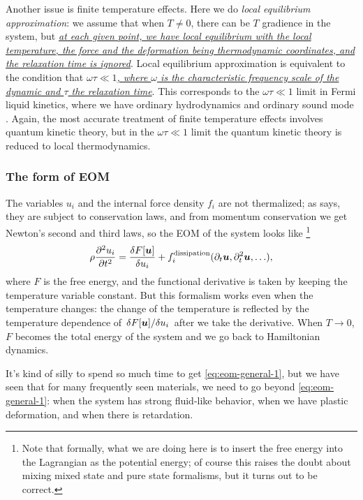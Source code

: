 \documentclass[hyperref, a4paper]{article}
\begin{document}
Another issue is finite temperature effects. 
Here we do \emph{local equilibrium approximation}:
we assume that when $T \neq 0$,
there can be $T$ gradience in the system,
but \ul{\emph{at each given point, 
we have local equilibrium with the local temperature, the force and the deformation
being thermodynamic coordinates,
and the relaxation time is ignored}}.
Local equilibrium approximation is equivalent to the 
condition that \ul{\emph{$\omega \tau \ll 1$,
where $\omega$ is the characteristic frequency scale of the dynamic
and $\tau$ the relaxation time}}.
This corresponds to the $\omega \tau \ll 1$ limit in Fermi liquid kinetics,
where we have ordinary hydrodynamics and ordinary sound mode \cite{belitz2022soft}.
Again, the most accurate treatment of finite temperature effects involves 
quantum kinetic theory,
but in the $\omega \tau \ll 1$ limit 
the quantum kinetic theory is reduced to local thermodynamics.

\subsubsection{The form of EOM}

The variables $u_i$ and the internal force density $f_i$ are not thermalized;
as \cite{belitz2022soft} says, 
they are subject to conservation laws,
and from momentum conservation we get Newton's second and third laws, 
so the EOM of the system looks like%
\footnote{
    Note that formally, 
    what we are doing here is to insert the free energy into the Lagrangian
    as the potential energy;
    of course this raises the doubt about 
    mixing mixed state and pure state formalisms,
    but it turns out to be correct.
} 
\begin{equation}
    \rho \pdv[2]{u_i}{t} = \fdv{F[\vb*{u}]}{u_i} + f^{\text{dissipation}}_i(\partial_t \vb*{u}, \partial_t^2 \vb*{u}, \ldots),
    \label{eq:eom-general-1}
\end{equation}
where $F$ is the free energy,
and the functional derivative is taken by keeping the temperature variable constant. 
But this formalism works even when the temperature changes:
the change of the temperature is reflected by the temperature dependence
of $\fdv*{F[\vb*{u}]}{u_i}$ after we take the derivative.
When $T \to 0$, $F$ becomes the total energy of the system 
and we go back to Hamiltonian dynamics.

It's kind of silly to spend so much time 
to get \eqref{eq:eom-general-1},
but we have seen that for many frequently seen materials,
we need to go beyond \eqref{eq:eom-general-1}:
when the system has strong fluid-like behavior,
when we have plastic deformation,
and when there is retardation.
\end{document}

